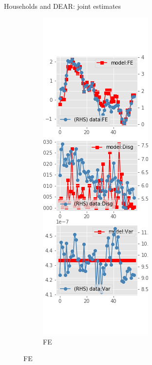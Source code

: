 \documentclass{beamer}
\begin{document}
\begin{frame}{Households and DEAR: joint estimates}
	\begin{figure}[ht]
		\label{DE_diag_joint_SCE}
		\begin{subfigure}[b]{0.2\textwidth}
			\centering
			\caption{FE}
			\includegraphics[width=\textwidth, height = 0.8\textheight]{figuresDraft/sce_de_est_joint_diag0.png}

\end{subfigure}
\end{figure}
\end{frame}
\end{document}
